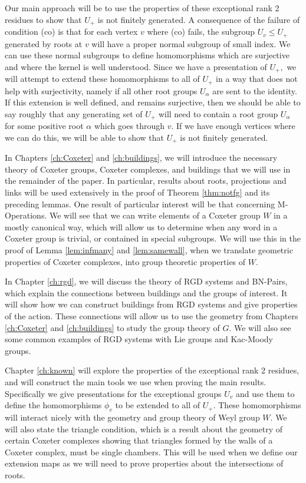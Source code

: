 \documentclass[class=book, crop=false,12 pt]{standalone}
\begin{document}
Our main approach will be to use the properties of these exceptional rank 2 residues to show that $U_+$ is not finitely generated. A consequence of the failure of condition (co) is that for each vertex $v$ where (co) fails, the subgroup $U_v\le U_+$ generated by roots at $v$ will have a proper normal subgroup of small index. We can use these normal subgroups to define homomorphisms which are surjective and where the kernel is well understood. Since we have a presentation of $U_+,$ we will attempt to extend these homomorphisms to all of $U_+$ in a way that does not help with surjectivity, namely if all other root groups $U_\alpha$ are sent to the identity. If this extension is well defined, and remains surjective, then we should be able to say roughly that any generating set of $U_+$ will need to contain a root group $U_\alpha$ for some positive root $\alpha$ which goes through $v.$ If we have enough vertices where we can do this, we will be able to show that $U_+$ is not finitely generated.

In Chapters \ref{ch:Coxeter} and \ref{ch:buildings}, we will introduce the necessary theory of Coxeter groups, Coxeter complexes, and buildings that we will use in the remainder of the paper. In particular, results about roots, projections and links will be used extensively in the proof of Theorem \ref{thm:notfg} and its preceding lemmas. One result of particular interest will be that concerning M-Operations. We will see that we can write elements of a Coxeter group $W$ in a mostly canonical way, which will allow us to determine when any word in a Coxeter group is trivial, or contained in special subgroups. We will use this in the proof of Lemma \ref{lem:infmany} and \ref{lem:samewall}, when we translate geometric properties of Coxeter complexes, into group theoretic properties of $W.$

In Chapter \ref{ch:rgd}, we will discuss the theory of RGD systems and BN-Pairs, which explain the connections between buildings and the groups of interest. It will show how we can construct buildings from RGD systems and give properties of the action. These connections will allow us to use the geometry from Chapters \ref{ch:Coxeter} and \ref{ch:buildings} to study the group theory of $G.$ We will also see some common examples of RGD systems with Lie groups and Kac-Moody groups.

Chapter \ref{ch:known} will explore the properties of the exceptional rank 2 residues, and will construct the main tools we use when proving the main results. Specifically we give presentations for the exceptional groups $U_v$ and use them to define the homomorphisms $\phi_v$ to be extended to all of $U_+.$ These homomorphisms will interact nicely with the geometry and group theory of Weyl group $W.$ We will also state the triangle condition, which is a result about the geometry of certain Coxeter complexes showing that triangles formed by the walls of a Coxeter complex, must be single chambers. This will be used when we define our extension maps as we will need to prove properties about the intersections of roots.
\end{document}
